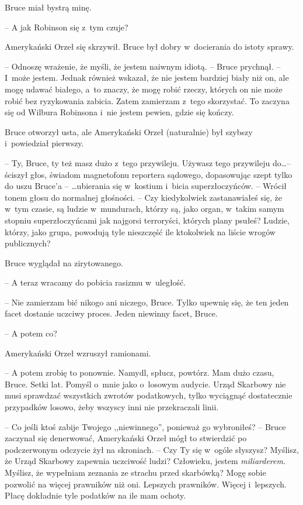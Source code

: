 \documentclass[oneside,polish,11pt,sfheadings]{mwbk}
\begin{document}
Bruce miał bystrą minę. 

-- A jak Robinson się z~tym czuje?

Amerykański Orzeł się skrzywił. Bruce był dobry w~docierania do istoty
sprawy. 

-- Odnoszę wrażenie, że myśli, że jestem naiwnym idiotą. -- Bruce
prychnął. -- I~może jestem. Jednak również wskazał, że nie jestem
bardziej biały niż on, ale mogę udawać białego, a~to znaczy, że mogę
robić rzeczy, których on nie może robić bez ryzykowania zabicia. Zatem
zamierzam z~tego skorzystać. To zaczyna się od Wilbura Robinsona i~nie
jestem pewien, gdzie się kończy.

Bruce otworzył usta, ale Amerykański Orzeł (naturalnie) był szybszy i~powiedział pierwszy.

-- Ty, Bruce, ty też masz dużo z~tego przywileju. Używasz tego przywileju
do\ldots  -- ściszył głos, świadom magnetofonu reportera sądowego,
dopasowując szept tylko do uszu Bruce'a -- \ldots  ubierania się w~kostium i~bicia superzłoczyńców. -- Wrócił tonem głosu do normalnej głośności. -- Czy kiedykolwiek zastanawiałeś się, że w~tym czasie, są ludzie w~mundurach, którzy są, jako organ, w~takim samym stopniu superzłoczyńcami
jak najgorsi terroryści, których plany psułeś? Ludzie, którzy, jako
grupa, powodują tyle nieszczęść ile ktokolwiek na liście wrogów
publicznych?

Bruce wyglądał na zirytowanego. 

-- A teraz wracamy do pobicia rasizmu w~uległość.

-- Nie zamierzam bić nikogo ani niczego, Bruce. Tylko upewnię się, że ten
jeden facet dostanie uczciwy proces. Jeden niewinny facet, Bruce.

-- A potem co?

Amerykański Orzeł wzruszył ramionami. 

-- A potem zrobię to ponownie.
Namydl, spłucz, powtórz. Mam dużo czasu, Bruce. Setki lat. Pomyśl o~mnie
jako o~losowym audycie. Urząd Skarbowy nie musi sprawdzać wszystkich
zwrotów podatkowych, tylko wyciągnąć dostatecznie przypadków losowo,
żeby wszyscy inni nie przekraczali linii.

-- Co jeśli ktoś zabije Twojego ,,niewinnego'', ponieważ go wybroniłeś? -- Bruce zaczynał się denerwować, Amerykański Orzeł mógł to stwierdzić po
podczerwonym odczycie żył na skroniach. -- Czy Ty się w~ogóle słyszysz?
Myślisz, że Urząd Skarbowy zapewnia uczciwość ludzi? Człowieku, jestem
\textit{miliarderem}. Myślisz, że wypełniam zeznania ze strachu przed
skarbówką? Mogę sobie pozwolić na więcej prawników niż oni. Lepszych
prawników. Więcej i~lepszych. Płacę dokładnie tyle podatków na ile mam
ochoty.
\end{document}
